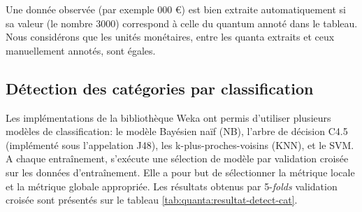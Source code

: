 Une donnée observée (par exemple  000 \euro \fg) est bien extraite automatiquement si sa valeur (le nombre $3000$) correspond à celle du quantum annoté dans le tableau. Nous considérons que les unités monétaires, entre les quanta extraits et ceux manuellement annotés, sont égales.




\subsection{Détection des catégories par classification}
Les implémentations de la bibliothèque Weka \citep{frank2016weka} ont permis d'utiliser plusieurs modèles de classification: le modèle Bayésien naïf (NB), l'arbre de décision C4.5 (implémenté sous l'appelation J48), les k-plus-proches-voisins (KNN), et le SVM. 
 A chaque entraînement, s'exécute une sélection de modèle par validation croisée sur les données d'entraînement. Elle a pour but de sélectionner la métrique locale et la métrique globale appropriée. Les résultats obtenus par 5-\textit{folds} validation croisée sont présentés sur le tableau \ref{tab:quanta:resultat-detect-cat}.  
 
